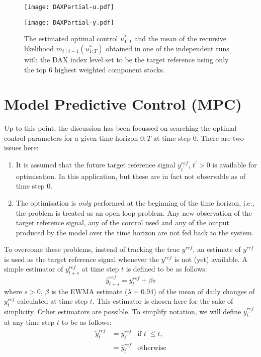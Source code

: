 \begin{figure}[htbp]
\centering
    \begin{minipage}{0.5\textwidth}
        \centering
        \texttt{[image: DAXPartial-u.pdf]}
    \end{minipage}%
    \begin{minipage}{0.5\textwidth}
        \centering
        \texttt{[image: DAXPartial-y.pdf]}
    \end{minipage}
\caption{The estimated optimal control $u^*_{1:T}$ and the mean of the recursive likelihood $m_{t \mid t-1}(u^*_{1:T})$ obtained in one of the independent runs with the DAX index level set to be the target reference using only the top $6$ highest weighted component stocks.}
\label{fig:daxpartial}
\end{figure}

\section{Model Predictive Control (MPC)}
Up to this point, the discussion has been focussed on searching the optimal control parameters for a given time horizon $0:T$ at time step $0$. There are two issues here:
\begin{enumerate}
\item It is assumed that the future target reference signal $y^{ref}_{t^\prime}$, $t^\prime > 0$ is available for optimisation. In this application, but these are in fact not observable as of time step $0$.
\item The optimisation is \emph{only} performed at the beginning of the time horizon, i.e., the problem is treated as an open loop problem. Any new observation of the target reference signal, any of the control used and any of the output produced by the model over the time horizon are not fed back to the system.
\end{enumerate}

To overcome these problems, instead of tracking the true $y^{ref}$, an estimate of $y^{ref}$ is used as the target reference signal whenever the $y^{ref}$ is not (yet) available. A simple estimator of $y^{ref}_{t+s}$ at time step $t$ is defined to be as follows:
\begin{equation}
  \hat{y}^{ref}_{t+s} = y^{ref}_{t} + \beta s
\end{equation}
where $s > 0$, $\beta$ is the EWMA estimate ($\lambda = 0.94$) of the mean of daily changes of $y^{ref}_t$ calculated at time step $t$. This estimator is chosen here for the sake of simplicity. Other estimators are possible. To simplify notation, we will define $\tilde{y}^{ref}_{t^\prime}$ at any time step $t$ to be as follows:
\begin{align}
\tilde{y}^{ref}_{t^\prime} &= y^{ref}_{t^\prime}&\text{if } t^\prime \leq t, \nonumber \\
                                      &= \hat{y}^{ref}_{t^\prime}&\text{otherwise}    
\end{align}

